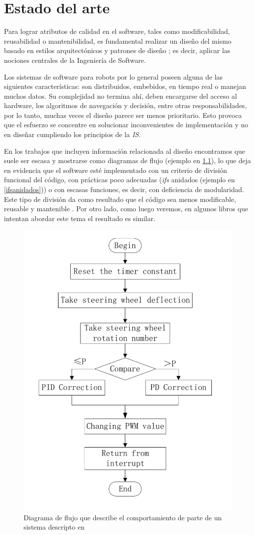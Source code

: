 \chapter{Estado del arte}


Para lograr atributos de calidad en el software, tales como modificabilidad, reusabilidad o mantenibilidad, es fundamental realizar un diseño del mismo basado en estilos arquitectónicos y patrones de diseño \cite{gamma,shawgarlan,buschmann}; es decir, aplicar las nociones centrales de la Ingeniería de Software.

Los sistemas de software para robots por lo general poseen alguna de las siguientes características: son distribuidos, embebidos, en tiempo real o manejan muchos datos. Su complejidad no termina ahí, deben encargarse del acceso al hardware, los algoritmos de navegación y decisión, entre otras responsabilidades, por lo tanto, muchas veces el diseño parece ser menos prioritario. Esto provoca que el esfuerzo se concentre en solucionar inconvenientes de implementación y no en diseñar cumpliendo los principios de la \textit{IS}.

En los trabajos que incluyen información relacionada al diseño \cite{bad-desing-auto,bad-desing-implantable,code-1,code-2,Zhang2009,bad-design-uml,bad-design-robot} encontramos que suele ser escasa y mostrarse como diagramas de flujo (ejemplo en \ref{flujo}), lo que deja en evidencia que el software esté implementado con un criterio de división funcional del código, con prácticas poco adecuadas (\textit{ifs} anidados (ejemplo en \ref{ifsanidados})) o con escasas funciones, es decir, con deficiencia de modularidad. Este tipo de división da como resultado que el código sea menos modificable, reusable y mantenible \cite{parnas72}. Por otro lado, como luego veremos, en algunos libros que intentan abordar este tema \cite{douglass} el resultado es similar.

\begin{figure}[h]
	\label{flujo}
    \centering
    \includegraphics[width=0.5\linewidth]{diagrama_de_flujo.png}
    \caption{Diagrama de flujo que describe el comportamiento de parte de un sistema descripto en \cite{bad-desing-auto}}
\end{figure}

